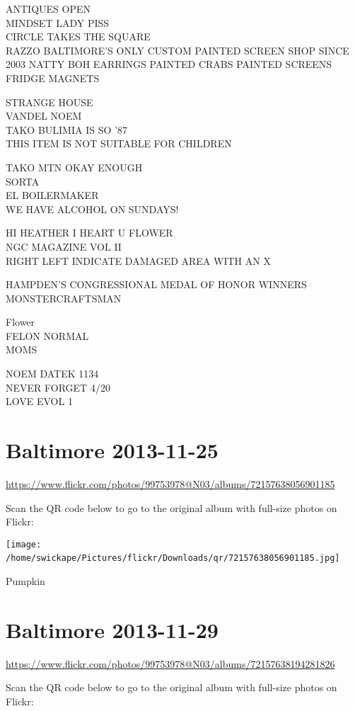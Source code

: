 \documentclass[10pt,letterpaper]{article}
\begin{document}
ANTIQUES OPEN\\
MINDSET LADY PISS\\
CIRCLE TAKES THE SQUARE\\
RAZZO BALTIMORE'S ONLY CUSTOM PAINTED SCREEN SHOP SINCE 2003 NATTY BOH EARRINGS PAINTED CRABS PAINTED SCREENS FRIDGE MAGNETS

STRANGE HOUSE\\
VANDEL NOEM\\
TAKO BULIMIA IS SO '87\\
THIS ITEM IS NOT SUITABLE FOR CHILDREN

TAKO MTN OKAY ENOUGH\\
SORTA\\
EL BOILERMAKER\\
WE HAVE ALCOHOL ON SUNDAYS!

HI HEATHER I HEART U FLOWER\\
NGC MAGAZINE VOL II\\
RIGHT LEFT INDICATE DAMAGED AREA WITH AN X

HAMPDEN'S CONGRESSIONAL MEDAL OF HONOR WINNERS\\
MONSTERCRAFTSMAN

Flower\\
FELON NORMAL\\
MOMS

NOEM DATEK 1134\\
NEVER FORGET 4/20\\
LOVE EVOL 1
\

\section*{Baltimore 2013-11-25}

\url{https://www.flickr.com/photos/99753978@N03/albums/72157638056901185}

Scan the QR code below to go to the original album with full-size photos on Flickr:

\texttt{[image: /home/swickape/Pictures/flickr/Downloads/qr/72157638056901185.jpg]}
\

Pumpkin
\

\section*{Baltimore 2013-11-29}

\url{https://www.flickr.com/photos/99753978@N03/albums/72157638194281826}

Scan the QR code below to go to the original album with full-size photos on Flickr:
\end{document}
